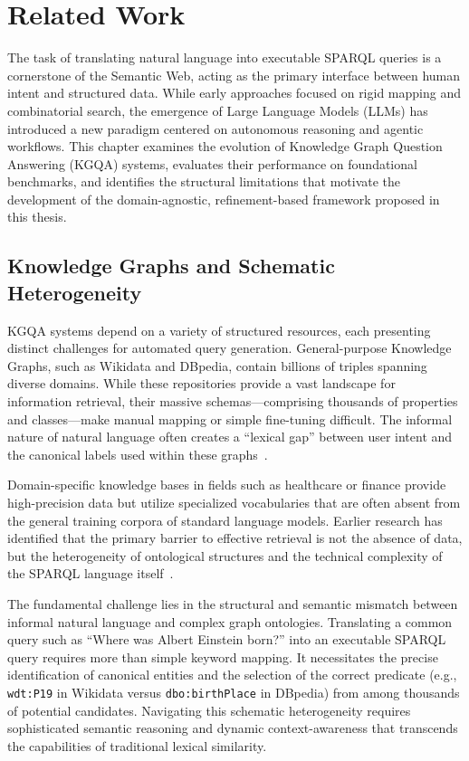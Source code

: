 \newpage

\section{Related Work}
\label{ch:related_work}

The task of translating natural language into executable SPARQL queries is a cornerstone of the Semantic Web, acting as the primary interface between human intent and structured data. While early approaches focused on rigid mapping and combinatorial search, the emergence of Large Language Models (LLMs) has introduced a new paradigm centered on autonomous reasoning and agentic workflows. This chapter examines the evolution of Knowledge Graph Question Answering (KGQA) systems, evaluates their performance on foundational benchmarks, and identifies the structural limitations that motivate the development of the domain-agnostic, refinement-based framework proposed in this thesis.

\subsection{Knowledge Graphs and Schematic Heterogeneity}
KGQA systems depend on a variety of structured resources, each presenting distinct challenges for automated query generation. General-purpose Knowledge Graphs, such as Wikidata and DBpedia, contain billions of triples spanning diverse domains. While these repositories provide a vast landscape for information retrieval, their massive schemas—comprising thousands of properties and classes—make manual mapping or simple fine-tuning difficult. The informal nature of natural language often creates a ``lexical gap'' between user intent and the canonical labels used within these graphs~\cite{hoffner_survey_2017}.

Domain-specific knowledge bases in fields such as healthcare or finance provide high-precision data but utilize specialized vocabularies that are often absent from the general training corpora of standard language models. Earlier research has identified that the primary barrier to effective retrieval is not the absence of data, but the heterogeneity of ontological structures and the technical complexity of the SPARQL language itself~\cite{diefenbach_core_2018, pereira_systematic_2022}.

The fundamental challenge lies in the structural and semantic mismatch between informal natural language and complex graph ontologies. Translating a common query such as ``Where was Albert Einstein born?'' into an executable SPARQL query requires more than simple keyword mapping. It necessitates the precise identification of canonical entities and the selection of the correct predicate (e.g., \texttt{wdt:P19} in Wikidata versus \texttt{dbo:birthPlace} in DBpedia) from among thousands of potential candidates. Navigating this schematic heterogeneity requires sophisticated semantic reasoning and dynamic context-awareness that transcends the capabilities of traditional lexical similarity.

